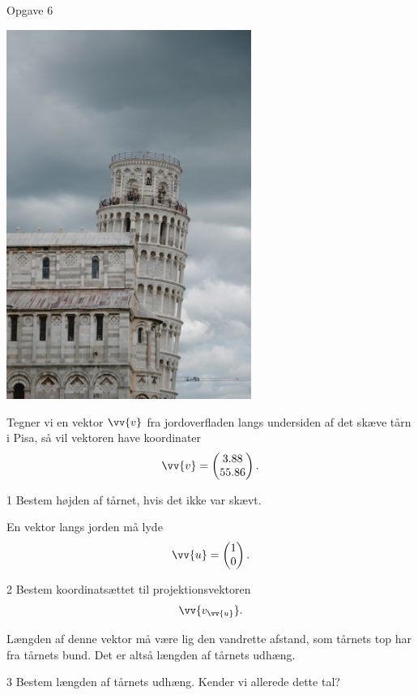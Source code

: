 \begin{opgavetekst}{Opgave 6}
	\begin{center}
		\includegraphics[width=0.6\textwidth]{Billeder/pisa}
	\end{center}
	Tegner vi en vektor $\vv{v}$ fra jordoverfladen langs undersiden af det skæve tårn i Pisa, så vil vektoren 
	have koordinater
	\begin{align*}
		\vv{v} = 
		\begin{pmatrix}
			3.88 \\
			55.86
		\end{pmatrix}.
	\end{align*}	 
\end{opgavetekst}
\begin{delopgave}{}{1}
	Bestem højden af tårnet, hvis det ikke var skævt. 
\end{delopgave}
\begin{meretekst}
	En vektor langs jorden må lyde 
	\begin{align*}
		\vv{u} = 
		\begin{pmatrix}
			1 \\ 0
		\end{pmatrix}.
	\end{align*}
\end{meretekst}
\begin{delopgave}{}{2}
	Bestem koordinatsættet til projektionsvektoren
	\begin{align*}
		\vv{v_{\vv{u}}}.
	\end{align*}
\end{delopgave}
\begin{meretekst}
	Længden af denne vektor må være lig den vandrette afstand, som tårnets top har fra tårnets bund. Det er 
	altså længden af tårnets udhæng.
\end{meretekst}
\begin{delopgave}{}{3}
	Bestem længden af tårnets udhæng. Kender vi allerede dette tal?
\end{delopgave}


